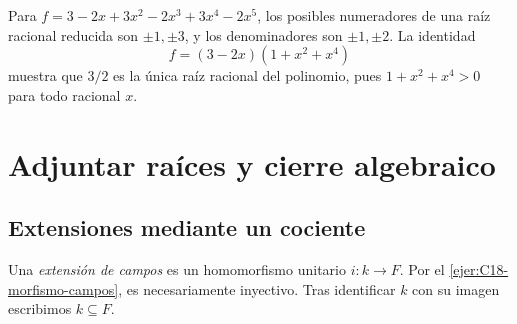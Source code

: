 \begin{ejem}
Para $f=3-2x+3x^2-2x^3+3x^4-2x^5$, los posibles numeradores de una raíz racional reducida son $\pm1,\pm3$, y los denominadores son $\pm1,\pm2$. La identidad
\[
f=(3-2x)(1+x^2+x^4)
\]
muestra que $3/2$ es la única raíz racional del polinomio, pues $1+x^2+x^4>0$ para todo racional $x$.
\end{ejem}

\section{Adjuntar raíces y cierre algebraico}
\subsection{Extensiones mediante un cociente}
Una \emph{extensión de campos} es un homomorfismo unitario $i:k\to F$. Por el \cref{ejer:C18-morfismo-campos}, es necesariamente inyectivo. Tras identificar $k$ con su imagen escribimos $k\subseteq F$.


